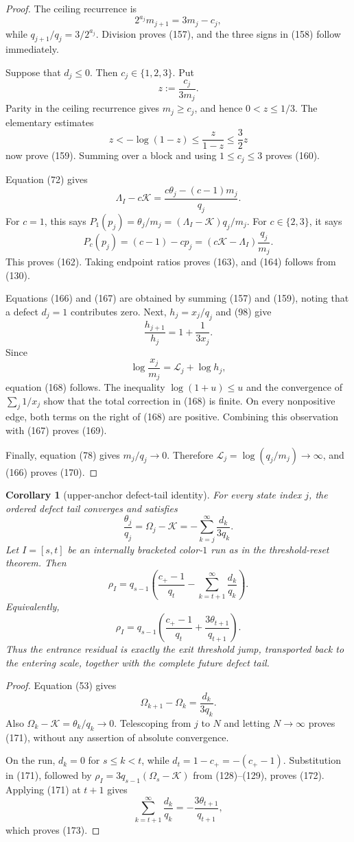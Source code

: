 \documentclass[11pt]{article}
\newtheorem{corollary}[theorem]{Corollary}
\begin{document}
\begin{proof}
The ceiling recurrence is
\[
  2^{a_j}m_{j+1}=3m_j-c_j,
\]
while $q_{j+1}/q_j=3/2^{a_j}$.  Division proves (157), and the three signs
in (158) follow immediately.

Suppose that $d_j\leq0$.  Then $c_j\in\{1,2,3\}$.  Put
\[
  z:=\frac{c_j}{3m_j}.
\]
Parity in the ceiling recurrence gives $m_j\geq c_j$, and hence
$0<z\leq1/3$.  The elementary estimates
\[
  z<-\log(1-z)\leq\frac{z}{1-z}\leq\frac32z
\]
now prove (159).  Summing over a block and using
$1\leq c_j\leq3$ proves (160).

Equation (72) gives
\[
  \Lambda_I-c\mathcal K
  =\frac{c\theta_j-(c-1)m_j}{q_j}.
\]
For $c=1$, this says
$P_1(p_j)=\theta_j/m_j=(\Lambda_I-\mathcal K)q_j/m_j$.
For $c\in\{2,3\}$, it says
\[
  P_c(p_j)=(c-1)-cp_j
  =(c\mathcal K-\Lambda_I)\frac{q_j}{m_j}.
\]
This proves (162).  Taking endpoint ratios proves (163), and (164) follows
from (130).

Equations (166) and (167) are obtained by summing (157) and (159), noting
that a defect $d_j=1$ contributes zero.  Next, $h_j=x_j/q_j$ and (98) give
\[
  \frac{h_{j+1}}{h_j}=1+\frac1{3x_j}.
\]
Since
\[
  \log\frac{x_j}{m_j}=\mathcal L_j+\log h_j,
\]
equation (168) follows.  The inequality
$\log(1+u)\leq u$ and the convergence of $\sum_j1/x_j$ show that the total
correction in (168) is finite.  On every nonpositive edge, both terms on
the right of (168) are positive.  Combining this observation with (167)
proves (169).

Finally, equation (78) gives $m_j/q_j\to0$.  Therefore
$\mathcal L_j=\log(q_j/m_j)\to\infty$, and (166) proves (170).
\end{proof}

\begin{corollary}[upper-anchor defect-tail identity]
For every state index $j$, the ordered defect tail converges and satisfies
\[
\boxed{
  \frac{\theta_j}{q_j}
  =\Omega_j-\mathcal K
  =-\sum_{k=j}^{\infty}\frac{d_k}{3q_k}.}
\tag{171}
\]
Let $I=[s,t]$ be an internally bracketed color-$1$ run as in the
threshold-reset theorem.  Then
\[
\boxed{
  \rho_I=q_{s-1}
  \left(
    \frac{c_+-1}{q_t}
    -\sum_{k=t+1}^{\infty}\frac{d_k}{q_k}
  \right).}
\tag{172}
\]
Equivalently,
\[
\boxed{
  \rho_I=q_{s-1}
  \left(
    \frac{c_+-1}{q_t}
    +\frac{3\theta_{t+1}}{q_{t+1}}
  \right).}
\tag{173}
\]
Thus the entrance residual is exactly the exit threshold jump, transported
back to the entering scale, together with the complete future defect tail.
\end{corollary}

\begin{proof}
Equation (53) gives
\[
  \Omega_{k+1}-\Omega_k=\frac{d_k}{3q_k}.
\]
Also $\Omega_k-\mathcal K=\theta_k/q_k\to0$.  Telescoping from $j$ to
$N$ and letting $N\to\infty$ proves (171), without any assertion of
absolute convergence.

On the run, $d_k=0$ for $s\leq k<t$, while
$d_t=1-c_+=-(c_+-1)$.  Substitution in (171), followed by
$\rho_I=3q_{s-1}(\Omega_s-\mathcal K)$ from (128)--(129), proves (172).
Applying (171) at $t+1$ gives
\[
  \sum_{k=t+1}^{\infty}\frac{d_k}{q_k}
  =-\frac{3\theta_{t+1}}{q_{t+1}},
\]
which proves (173).
\end{proof}
\end{document}
